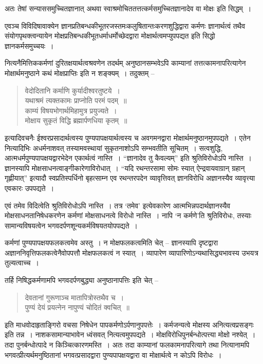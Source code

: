 {अतः तेषां सन्याससमुच्चितज्ञानात् अथवा स्वाश्रमोचिततत्तत्कर्मसमुच्चितज्ञानादेव वा मोक्षः इति सिद्धम्~। 

एवञ्च विविदिषावाक्येन ज्ञानप्रतिबन्धकीभूतरजस्तमःकलुषितान्तःकरणशुद्धिद्वारा कर्मणः ज्ञानार्थत्वं तथैव संयोगपृथक्त्वन्यायेन मोक्षप्रतिबन्धकीभूतधर्माधर्मोच्छेदद्वारा मोक्षार्थत्वमप्युपपद्यत इति सिद्धो ज्ञानकर्मसमुच्चयः~। 

नित्यनैमित्तिककर्मणां दुरितक्षयार्थत्वश्रवणेन तदर्थम् अनुष्ठानसम्भवेऽपि काम्यानां तत्तत्कामनापरित्यागेन मोक्षार्थमनुष्ठाने कथं मोक्षप्राप्तिः इति न शङ्क्यम्~। तदुक्तम् –
\begin{verse}
वेदोदितानि कर्माणि कुर्यादीश्वरतुष्टये~। \\
यथाश्रमं त्यक्तकामः प्राप्नोति परमं पदम्~॥\\
काम्यं विषयभोगार्थमिहामुत्र प्रयुज्यते~। \\
मोक्षाय सुकृतं विद्धि ब्रह्मार्पणधिया कृतम्~॥
\end{verse}
इत्यादिवचनैः ईश्वरप्रसादार्थत्वस्य पुण्यपापक्षयार्थत्वस्य च अवगमनद्वारा मोक्षार्थमनुष्ठानमुपपद्यते~। एतेन नित्यादिभिः अधर्मनाशवत् तस्यामवस्थायां सुकृतनाशोऽपि सम्भवतीति सूचितम्~। सत्वशुद्धि, आत्मधर्मपुण्यपापक्षयद्वारभेदेन एकार्थत्वं नास्ति~। “ज्ञानादेव तु कैवल्यम्” इति श्रुतिविरोधोऽपि नास्ति~। ज्ञानस्यापि मोक्षसाधनत्वाङ्गीकारेणाविरोधात्~। “यदि रथन्तरसामा सोमः स्यात् ऐन्द्रवायवाग्रान् ग्रहान् गृह्णीयात्” इत्यादौ स्वप्रतिस्पर्धिनो बृहत्साम्न एव रथन्तरपदेन व्यावृत्तिवत् ज्ञानविरोधि अज्ञानस्यैव व्यावृत्त्या एवकारः उपपद्यते~। 

एवं तमेव विदित्वेति श्रुतिविरोधोऽपि नास्ति~। तत्र ‘तमेव’ इत्येवकारेण आत्मभिन्नपदार्थज्ञानस्यैव मोक्षसाधनतानिषेधकरणेन कर्मणां मोक्षसाधनत्वे विरोधो नास्ति~। नापि ‘न कर्मणे’ति श्रुतिविरोधः, तस्याः सामान्यविषयत्वेन भगवदर्पणशून्यकर्मविषयतयोपपद्यते~। 

कर्मणां पुण्यपापक्षयफलकत्वमेव अस्तु~। न मोक्षफलकत्वमिति चेत् – ज्ञानस्यापि दृष्टद्वारा अज्ञाननिवृत्तिफलकत्वेनैवोपपत्तौ मोक्षफलकत्वं न स्यात्~। व्यापारेण व्यापारिणोऽन्यथासिद्ध्यभावस्य उभयत्र तुल्यत्वाच्च~। 

तर्हि निषिद्धकर्मणामपि भगवदर्पणबुद्ध्या अनुष्ठानापत्तिः इति चेत् –
\begin{verse}
देवतानां गुरूणाञ्च मातापित्रोस्तथैव च~। \\
पुण्यं देयं प्रयत्नेन नापुण्यं चोदितं क्वचित्~॥
\end{verse}
इति माधवोदाहृताङ्गिरो वचसा निषेधेन पापकर्मणोऽर्पणानुपपत्तेः~। कर्मजन्यत्वे मोक्षस्य अनित्यत्वप्रसङ्गः इति तन्न~। नाशकसामान्याभावेन ध्वंसवत् नित्यत्वमुपपद्यते~। मोक्षविरोधिपुनर्बन्धोत्पत्त्या मोक्षो नश्येत्~। तदा पुनर्बन्धोत्पादे न किञ्चित्कारणमस्ति~। अतः तदा काम्यानां फलकामनापरित्यागे तथा नित्यानामपि भगवत्प्रीत्यर्थमनुष्ठितानां भगवत्प्रसादद्वारा पुण्यपापक्षयद्वारा वा मोक्षार्थत्वे न कोऽपि विरोधः~। 

}
